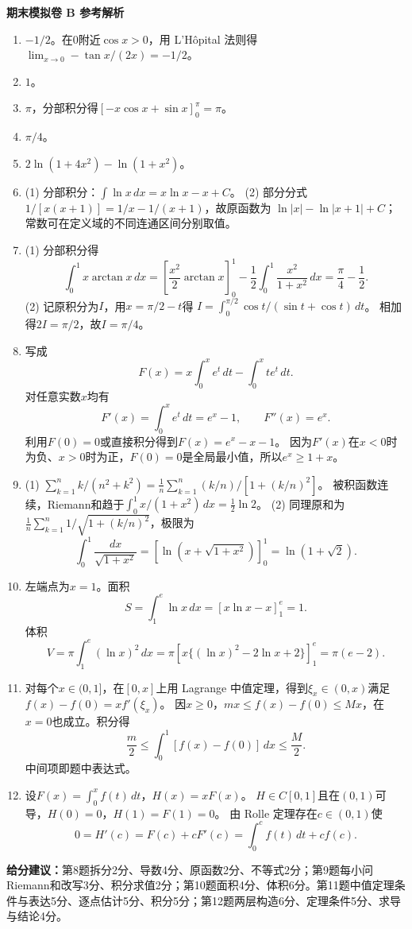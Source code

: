 \documentclass[11pt,a4paper,fontset=fandol]{ctexart}
\newcommand{\answerpaper}[1]{\clearpage\begin{center}{\LARGE\bfseries #1}\end{center}}
\begin{document}
\answerpaper{期末模拟卷 B 参考解析}
\begin{enumerate}
\item $-1/2$。在$0$附近$\cos x>0$，用 L'Hôpital 法则得$\lim_{x\to0}-\tan x/(2x)=-1/2$。
\item $1$。
\item $\pi$，分部积分得$[-x\cos x+\sin x]_0^\pi=\pi$。
\item $\pi/4$。
\item $2\ln(1+4x^2)-\ln(1+x^2)$。
\item (1) 分部积分：$\int\ln x\,dx=x\ln x-x+C$。
(2) 部分分式$1/[x(x+1)]=1/x-1/(x+1)$，故原函数为
$\ln|x|-\ln|x+1|+C$；常数可在定义域的不同连通区间分别取值。
\item (1) 分部积分得
\[\int_0^1x\arctan x\,dx
=\left[\frac{x^2}2\arctan x\right]_0^1-\frac12\int_0^1\frac{x^2}{1+x^2}\,dx
=\frac\pi4-\frac12.\]
(2) 记原积分为$I$，用$x=\pi/2-t$得
$I=\int_0^{\pi/2}\cos t/(\sin t+\cos t)\,dt$。
相加得$2I=\pi/2$，故$I=\pi/4$。
\item 写成
\[F(x)=x\int_0^xe^t\,dt-\int_0^xte^t\,dt.\]
对任意实数$x$均有
\[F'(x)=\int_0^xe^t\,dt=e^x-1,\qquad F''(x)=e^x.\]
利用$F(0)=0$或直接积分得到$F(x)=e^x-x-1$。
因为$F'(x)$在$x<0$时为负、$x>0$时为正，$F(0)=0$是全局最小值，所以$e^x\ge1+x$。
\item (1) $\sum_{k=1}^n k/(n^2+k^2)=\frac1n\sum_{k=1}^n (k/n)/[1+(k/n)^2]$。
被积函数连续，Riemann和趋于$\int_0^1x/(1+x^2)\,dx=\frac12\ln2$。
(2) 同理原和为$\frac1n\sum_{k=1}^n1/\sqrt{1+(k/n)^2}$，极限为
\[\int_0^1\frac{dx}{\sqrt{1+x^2}}=\left[\ln(x+\sqrt{1+x^2})\right]_0^1
=\ln(1+\sqrt2).\]
\item 左端点为$x=1$。面积
\[S=\int_1^e\ln x\,dx=[x\ln x-x]_1^e=1.\]
体积
\[V=\pi\int_1^e(\ln x)^2\,dx
=\pi\left[x\{(\ln x)^2-2\ln x+2\}\right]_1^e=\pi(e-2).\]
\item 对每个$x\in(0,1]$，在$[0,x]$上用 Lagrange 中值定理，得到$\xi_x\in(0,x)$满足$f(x)-f(0)=x f'(\xi_x)$。
因$x\ge0$，$mx\le f(x)-f(0)\le Mx$，在$x=0$也成立。积分得
\[\frac m2\le\int_0^1[f(x)-f(0)]\,dx\le\frac M2.\]
中间项即题中表达式。
\item 设$F(x)=\int_0^xf(t)\,dt$，$H(x)=xF(x)$。
$H\in C[0,1]$且在$(0,1)$可导，$H(0)=0$，$H(1)=F(1)=0$。
由 Rolle 定理存在$c\in(0,1)$使
\[0=H'(c)=F(c)+cF'(c)=\int_0^cf(t)\,dt+c f(c).\]
\end{enumerate}
\textbf{给分建议：}第8题拆分2分、导数4分、原函数2分、不等式2分；第9题每小问Riemann和改写3分、积分求值2分；第10题面积4分、体积6分。第11题中值定理条件与表达5分、逐点估计5分、积分5分；第12题两层构造6分、定理条件5分、求导与结论4分。
\end{document}
